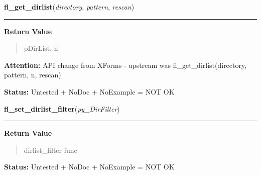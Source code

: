 \hspace{.8\funcindent}\begin{boxedminipage}{\funcwidth}

    \raggedright \textbf{fl\_get\_dirlist}(\textit{directory}, \textit{pattern}, \textit{rescan})

    \vspace{-1.5ex}

    \rule{\textwidth}{0.5\fboxrule}
\setlength{\parskip}{2ex}
\setlength{\parskip}{1ex}
      \textbf{Return Value}
    \vspace{-1ex}

      \begin{quote}
      pDirList, n

      \end{quote}

\textbf{Attention:} API change from XForms - upstream was fl\_get\_dirlist(directory, pattern, 
n, rescan)



\textbf{Status:} Untested + NoDoc + NoExample = NOT OK



    \end{boxedminipage}

    \label{xformslib:library:fl_set_dirlist_filter}

    \vspace{0.5ex}

\hspace{.8\funcindent}\begin{boxedminipage}{\funcwidth}

    \raggedright \textbf{fl\_set\_dirlist\_filter}(\textit{py\_DirFilter})

    \vspace{-1.5ex}

    \rule{\textwidth}{0.5\fboxrule}
\setlength{\parskip}{2ex}
\setlength{\parskip}{1ex}
      \textbf{Return Value}
    \vspace{-1ex}

      \begin{quote}
      dirlist\_filter func

      \end{quote}

\textbf{Status:} Untested + NoDoc + NoExample = NOT OK



    \end{boxedminipage}

